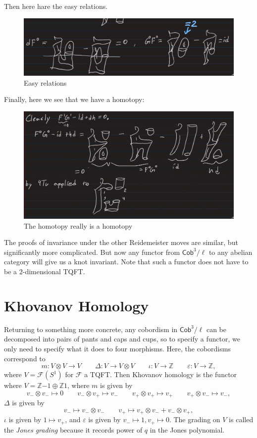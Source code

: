 \documentclass[leqno, openany]{memoir}
\theoremstyle{definition}
\theoremstyle{remark}
\theoremstyle{plain}
\theoremstyle{definition}
\theoremstyle{remark}
\newcommand{\Z}{\mathbb{Z}}
\newcommand{\ep}{\varepsilon}
\newcommand{\mc}[1]{\mathcal{#1}}
\newcommand{\ms}[1]{\mathsf{#1}}
\begin{document}
Then here hare the easy relations.

\begin{figure}[H]
    \centering
    \includegraphics[width=0.8\linewidth]{seb7.png}
    \caption{Easy relations}%
    \label{fig:seb5}
\end{figure}

Finally, here we see that we have a homotopy:

\begin{figure}[H]
    \centering
    \includegraphics[width=0.8\linewidth]{seb8.png}
    \caption{The homotopy really is a homotopy}%
    \label{fig:seb6}
\end{figure}

The proofs of invariance under the other Reidemeister moves are similar, but significantly more complicated. But now any functor from $\ms{Cob}^3/\ell$ to any abelian category will give us a knot invariant. Note that such a functor does not have to be a $2$-dimensional TQFT.

\section{Khovanov Homology}%
\label{sec:khovanov_homology}

Returning to something more concrete, any cobordism in $\ms{Cob}^3/\ell$ can be decomposed into pairs of pants and caps and cups, so to specify a functor, we only need to specify what it does to four morphisms. Here, the cobordisms correspond to
\[ m \colon V \otimes V \to V \qquad \Delta \colon V \to V \otimes V \qquad \iota \colon V \to \Z \qquad \ep \colon V \to \Z, \]
where $V = \mc{F}(S^1)$ for $\mc{F}$ a TQFT. Then Khovanov homology is the functor where $V = \Z \qty{-1} \oplus \Z \qty{1}$, where $m$ is given by
\[ v_- \otimes v_- \mapsto 0 \qquad v_- \otimes v_+ \mapsto v_- \qquad v_+ \otimes v_+ \mapsto v_+ \qquad v_+ \otimes v_- \mapsto v_- ,\]
$\Delta$ is given by
\[ v_- \mapsto v_- \otimes v_- \qquad v_+ \mapsto v_+ \otimes v_- + v_- \otimes v_+, \]
$\iota$ is given by $1 \mapsto v_+$, and $\ep$ is given by $v_- \mapsto 1, v_+ \mapsto 0$. The grading on $V$ is called the \textit{Jones grading} because it records power of $q$ in the Jones polynomial.
\end{document}
